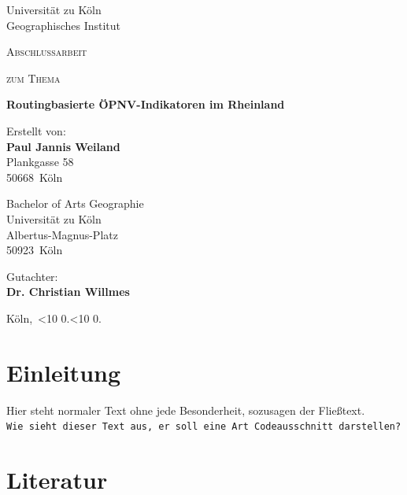 \documentclass[11pt,a4paper]{scrartcl}
\title{\haThema}
\author{\haAutor}
\date{\today}
\newcommand{\leadingzero}[1]{\ifnum #1<10 0\the#1\else\the#1\fi}
\newcommand{\datumVonHeute}{\leadingzero{\day}.\leadingzero{\month}.\the\year}
\newcommand{\haThema}{Routingbasierte ÖPNV-Indikatoren im Rheinland}
\newcommand{\haAutor}{Paul Jannis Weiland}
\newcommand{\haAutorAdresse}{Plankgasse 58}
\newcommand{\haAutorPLZ}{50668}
\newcommand{\haAutorOrt}{Köln}
\newcommand{\haDeckblattTextEins}{Abschlussarbeit}
\newcommand{\haDeckblattTextZwei}{Bachelor of Arts Geographie}
\newcommand{\haSchule}{Universität zu Köln}
\newcommand{\haSchuleAdresse}{Albertus-Magnus-Platz}
\newcommand{\haSchulePLZ}{50923}
\newcommand{\haSchuleOrt}{Köln}
\newcommand{\haGutachter}{Dr. Christian  Willmes}
\newcommand{\haGutachterText}{}
\begin{document}
    
    \begin{titlepage}
        Universität zu Köln\\
        Geographisches Institut
        \begin{center}
            \vspace{1.5cm}
            {\scshape\large \haDeckblattTextEins \par}
            \vspace{1cm}
            {\scshape\large zum Thema\par}
            \vspace{1.5cm}
            {\LARGE\bfseries \haThema \par}
            \vfill
            {Erstellt von:\\ {\bfseries \haAutor}\\ \haAutorAdresse\\ \haAutorPLZ~\haAutorOrt \par}
            \vspace{1cm}
            {\haDeckblattTextZwei \\ \haSchule \\ \haSchuleAdresse \\ \haSchulePLZ~\haSchuleOrt \par}
            \vspace{1cm}
            Gutachter:\\ {\bfseries \haGutachter}\\ \haGutachterText
            \vfill
        \end{center}
        {\haAutorOrt,~\datumVonHeute\par}
    \end{titlepage}
    \thispagestyle{empty}
    \newpage
    
    \tableofcontents
    \thispagestyle{empty}
    \newpage
    
    \setcounter{page}{1}
    \section{Einleitung}
    Hier steht normaler Text ohne jede Besonderheit, sozusagen der Fließtext.\\
    \texttt{Wie sieht dieser Text aus, er soll eine Art Codeausschnitt darstellen?}
    \section{Literatur}
\end{document}
